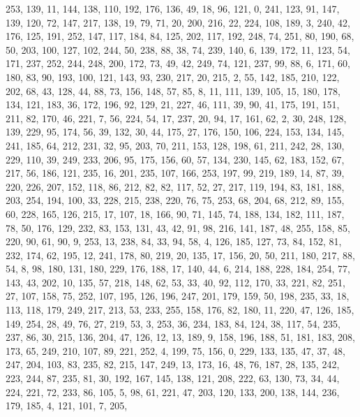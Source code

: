 \begin{DoxyCode}
       253, 139, 11, 144, 138, 110, 192, 176, 136, 49, 18, 96, 121, 0, 241, 123, 91, 147, 139, 120, 72, 147, 217,
       138, 19, 79, 71, 20, 200, 216, 22, 224, 108, 189, 3, 240, 42, 176, 125, 191, 252, 147, 117, 184, 84, 125, 202,
       117, 192, 248, 74, 251, 80, 190, 68, 50, 203, 100, 127, 102, 244, 50, 238, 88, 38, 74, 239, 140, 6, 139,
       172, 11, 123, 54, 171, 237, 252, 244, 248, 200, 172, 73, 49, 42, 249, 74, 121, 237, 99, 88, 6, 171, 60, 180,
       83, 90, 193, 100, 121, 143, 93, 230, 217, 20, 215, 2, 55, 142, 185, 210, 122, 202, 68, 43, 128, 44, 88, 73,
       156, 148, 57, 85, 8, 11, 111, 139, 105, 15, 180, 178, 134, 121, 183, 36, 172, 196, 92, 129, 21, 227, 46, 111,
       39, 90, 41, 175, 191, 151, 211, 82, 170, 46, 221, 7, 56, 224, 54, 17, 237, 20, 94, 17, 161, 62, 2, 30, 248,
       128, 139, 229, 95, 174, 56, 39, 132, 30, 44, 175, 27, 176, 150, 106, 224, 153, 134, 145, 241, 185, 64, 212,
       231, 32, 95, 203, 70, 211, 153, 128, 198, 61, 211, 242, 28, 130, 229, 110, 39, 249, 233, 206, 95, 175, 156,
       60, 57, 134, 230, 145, 62, 183, 152, 67, 217, 56, 186, 121, 235, 16, 201, 235, 107, 166, 253, 197, 99, 219,
       189, 14, 87, 39, 220, 226, 207, 152, 118, 86, 212, 82, 82, 117, 52, 27, 217, 119, 194, 83, 181, 188, 203,
       254, 194, 100, 33, 228, 215, 238, 220, 76, 75, 253, 68, 204, 68, 212, 89, 155, 60, 228, 165, 126, 215, 17,
       107, 18, 166, 90, 71, 145, 74, 188, 134, 182, 111, 187, 78, 50, 176, 129, 232, 83, 153, 131, 43, 42, 91, 98,
       216, 141, 187, 48, 255, 158, 85, 220, 90, 61, 90, 9, 253, 13, 238, 84, 33, 94, 58, 4, 126, 185, 127, 73, 84,
       152, 81, 232, 174, 62, 195, 12, 241, 178, 80, 219, 20, 135, 17, 156, 20, 50, 211, 180, 217, 88, 54, 8, 98,
       180, 131, 180, 229, 176, 188, 17, 140, 44, 6, 214, 188, 228, 184, 254, 77, 143, 43, 202, 10, 135, 57, 218,
       148, 62, 53, 33, 40, 92, 112, 170, 33, 221, 82, 251, 27, 107, 158, 75, 252, 107, 195, 126, 196, 247, 201, 179,
       159, 50, 198, 235, 33, 18, 113, 118, 179, 249, 217, 213, 53, 233, 255, 158, 176, 82, 180, 11, 220, 47, 126,
       185, 149, 254, 28, 49, 76, 27, 219, 53, 3, 253, 36, 234, 183, 84, 124, 38, 117, 54, 235, 237, 86, 30, 215,
       136, 204, 47, 126, 12, 13, 189, 9, 158, 196, 188, 51, 181, 183, 208, 173, 65, 249, 210, 107, 89, 221, 252, 4,
       199, 75, 156, 0, 229, 133, 135, 47, 37, 48, 247, 204, 103, 83, 235, 82, 215, 147, 249, 13, 173, 16, 48, 76,
       187, 28, 135, 242, 223, 244, 87, 235, 81, 30, 192, 167, 145, 138, 121, 208, 222, 63, 130, 73, 34, 44, 224,
       221, 72, 233, 86, 105, 5, 98, 61, 221, 47, 203, 120, 133, 200, 138, 144, 236, 179, 185, 4, 121, 101, 7, 205,

\end{DoxyCode}
